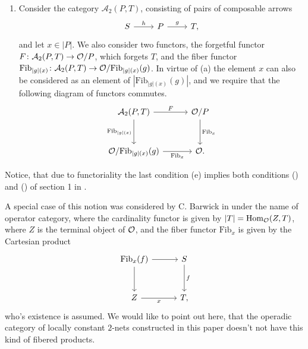 \documentclass[letterpaper,12pt,leqno]{article}
\numberwithin{equation}{theorem}
\def\cA{\mathcal{A}}
\def\Fib{\mathrm{Fib}}
\begin{document}
\begin{nparagraph}
\begin{enumerate}[label=\alph*)]
\item Consider the category $\mathcal{A}_2(P, T)$, consisting of pairs of composable arrows
$$
\begin{tikzcd}
S \ar[r, "h"] & P \ar[r, "g"] & T,
\end{tikzcd}
$$
and let $x \in |P|$. We also consider two functors, the forgetful functor $F\from \cA_2(P, T) \to \O / P$, which forgets $T$, and the fiber functor $\Fib_{|g|(x)}\from \cA_2(P, T) \to \O / \Fib_{|g|(x)}(g)$.
In virtue of (a) the element $x$ can also be considered as an element of $|\Fib_{|g|(x)}(g)|$, and we require that the following diagram of functors commutes.
$$
\begin{tikzcd}[sep=3em]
\cA_2(P, T) \ar[d, "\Fib_{|g|(x)}"'] \ar[r, "F"] & \O / P \ar[d, "\Fib_x"] \\
\O / \Fib_{|g|(x)}(g) \ar[r, "\Fib_x"'] & \O.
\end{tikzcd}
$$
\end{enumerate}
Notice, that due to functoriality the last condition (e) implies both conditions () and () of section 1 in \cite{Bat-Markl}.

A special case of this notion was considered by C. Barwick in \cite{Barwick} under the name of operator category, where the cardinality functor is given by $|T| = \mathrm{Hom}_{\mathcal{O}}(Z, T)$, where $Z$ is the terminal object
of $\mathcal{O}$, and the fiber functor $\Fib_x$ is given by the Cartesian product
$$
\begin{tikzcd}[sep=3em]
\Fib_x(f) \ar[d] \ar[r] & S \ar[d, "f"] \\
Z \ar[r, "x"'] & T,
\end{tikzcd}
$$
who's existence is assumed. We would like to point out here, that the operadic category of locally constant $2$-nets constructed in this paper doesn't not have this kind of fibered products.
\end{nparagraph}
\end{document}
